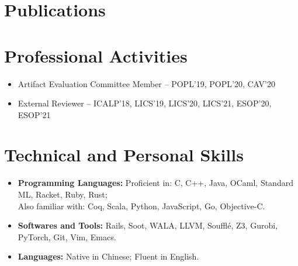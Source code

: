 \documentclass[11pt,letterpaper,roman]{moderncv}        %
\begin{document}
\section{Publications}
\vspace{4pt}

\section{Professional Activities}

\begin{itemize}
  \item Artifact Evaluation Committee Member -- POPL'19, POPL'20, CAV'20
  \item External Reviewer -- ICALP'18, LICS'19, LICS'20, LICS'21, ESOP'20, ESOP'21
\end{itemize}

\section{Technical and Personal Skills}

\begin{itemize}

\item \textbf{Programming Languages:} Proficient in: C, C++, Java, OCaml, Standard ML, Racket, Ruby, Rust; \\ Also familiar with: Coq, Scala, Python, JavaScript, Go, Objective-C.

\vspace{4pt}

\item \textbf{Softwares and Tools:} Rails, Soot, WALA, LLVM, Souffl{\'e}, Z3, Gurobi, PyTorch, Git, Vim, Emacs.

\vspace{4pt}

\item \textbf{Languages:} Native in Chinese; Fluent in English.

\end{itemize}
\end{document}
